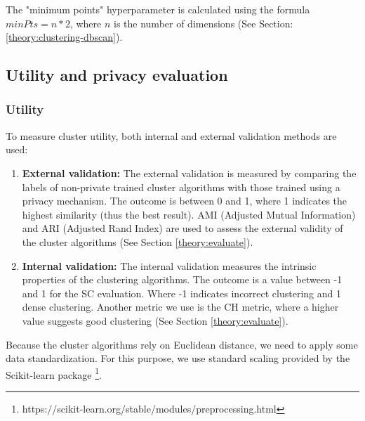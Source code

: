 The "minimum points" hyperparameter is calculated using the formula $minPts = n * 2$, where $n$ is the number of dimensions (See Section: \ref{theory:clustering-dbscan}).

\newpage
\subsection{Utility and privacy evaluation}
\subsubsection*{Utility}
To measure cluster utility, both internal and external validation methods are used:
{}
\begin{enumerate}
  \item \textbf{External validation: }
        The external validation is measured by comparing the labels of non-private trained cluster algorithms with those trained using a privacy mechanism.
        The outcome is between 0 and 1, where 1 indicates the highest similarity (thus the best result).
        AMI (Adjusted Mutual Information) and ARI (Adjusted Rand Index) are used to assess the external validity of the cluster algorithms (See Section \ref{theory:evaluate}).
  \item \textbf{Internal validation: }
        The internal validation measures the intrinsic properties of the clustering algorithms.
        The outcome is a value between -1 and 1 for the SC evaluation.
        Where -1 indicates incorrect clustering and 1 dense clustering.
        Another metric we use is the CH metric, where a higher value suggests good clustering (See Section \ref{theory:evaluate}).
\end{enumerate}
Because the cluster algorithms rely on Euclidean distance, we need to apply some data standardization.
For this purpose, we use standard scaling provided by the Scikit-learn package \footnote{https://scikit-learn.org/stable/modules/preprocessing.html}.

